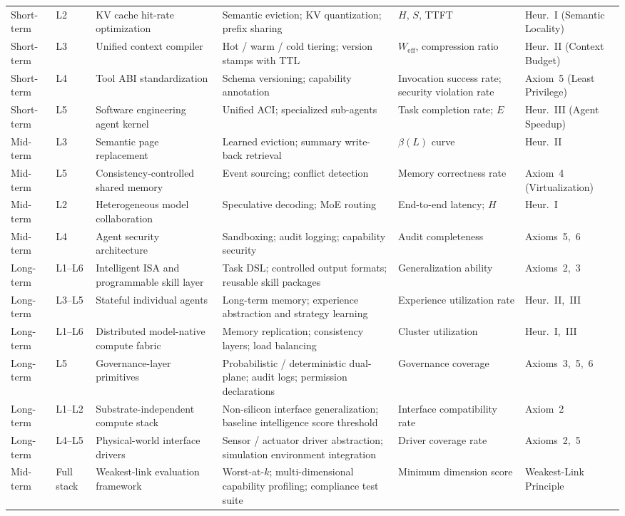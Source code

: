 \begin{longtable}{>{\small}p{}>{\small}p{}>{\small}p{}>{\small}p{}>{\small}p{}>{\small}p{}}
Short-term & L2 & KV cache hit-rate optimization & Semantic eviction; KV quantization; prefix sharing & $H$, $S$, TTFT & Heur.~I (Semantic Locality) \\[3pt]
Short-term & L3 & Unified context compiler & Hot / warm / cold tiering; version stamps with TTL & $W_{\mathrm{eff}}$, compression ratio & Heur.~II (Context Budget) \\[3pt]
Short-term & L4 & Tool ABI standardization & Schema versioning; capability annotation & Invocation success rate; security violation rate & Axiom~5 (Least Privilege) \\[3pt]
Short-term & L5 & Software engineering agent kernel & Unified ACI; specialized sub-agents & Task completion rate; $E$ & Heur.~III (Agent Speedup) \\[3pt]
Mid-term & L3 & Semantic page replacement & Learned eviction; summary write-back retrieval & $\beta(L)$ curve & Heur.~II \\[3pt]
Mid-term & L5 & Consistency-controlled shared memory & Event sourcing; conflict detection & Memory correctness rate & Axiom~4 (Virtualization) \\[3pt]
Mid-term & L2 & Heterogeneous model collaboration & Speculative decoding; MoE routing & End-to-end latency; $H$ & Heur.~I \\[3pt]
Mid-term & L4 & Agent security architecture & Sandboxing; audit logging; capability security & Audit completeness & Axioms~5,~6 \\[3pt]
Long-term & L1--L6 & Intelligent ISA and programmable skill layer & Task DSL; controlled output formats; reusable skill packages & Generalization ability & Axioms~2,~3 \\[3pt]
Long-term & L3--L5 & Stateful individual agents & Long-term memory; experience abstraction and strategy learning & Experience utilization rate & Heur.~II,~III \\[3pt]
Long-term & L1--L6 & Distributed model-native compute fabric & Memory replication; consistency layers; load balancing & Cluster utilization & Heur.~I,~III \\[3pt]
Long-term & L5 & Governance-layer primitives & Probabilistic / deterministic dual-plane; audit logs; permission declarations & Governance coverage & Axioms~3,~5,~6 \\[3pt]
Long-term & L1--L2 & Substrate-independent compute stack & Non-silicon interface generalization; baseline intelligence score threshold & Interface compatibility rate & Axiom~2 \\[3pt]
Long-term & L4--L5 & Physical-world interface drivers & Sensor / actuator driver abstraction; simulation environment integration & Driver coverage rate & Axioms~2,~5 \\[3pt]
Mid-term & Full stack & Weakest-link evaluation framework & Worst-at-$k$; multi-dimensional capability profiling; compliance test suite & Minimum dimension score & Weakest-Link Principle \\[3pt]
\bottomrule
\end{longtable}
\renewcommand{\arraystretch}{1.0}
\normalsize

